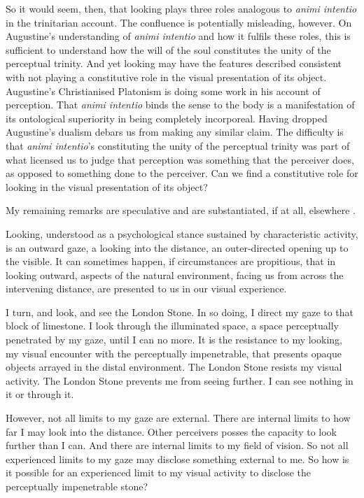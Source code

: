 \documentclass[12pt]{article}
\begin{document}
So it would seem, then, that looking plays three roles analogous to \emph{animi intentio} in the trinitarian account. The confluence is potentially misleading, however. On Augustine's understanding of \emph{animi intentio} and how it fulfils these roles, this is sufficient to understand how the will of the soul constitutes the unity of the perceptual trinity. And yet looking may have the features described consistent with not playing a constitutive role in the visual presentation of its object. Augustine's Christianised Platonism is doing some work in his account of perception. That \emph{animi intentio} binds the sense to the body is a manifestation of its ontological superiority in being completely incorporeal. Having dropped Augustine's dualism debars us from making any similar claim. The difficulty is that \emph{animi intentio}'s constituting the unity of the perceptual trinity was part of what licensed us to judge that perception was something that the perceiver does, as opposed to something done to the perceiver. Can we find a constitutive role for looking in the visual presentation of its object?

My remaining remarks are speculative and are substantiated, if at all, elsewhere \citep{Kalderon:2015aa}.

Looking, understood as a psychological stance sustained by characteristic activity, is an outward gaze, a looking into the distance, an outer-directed opening up to the visible. It can sometimes happen, if circumstances are propitious, that in looking outward, aspects of the natural environment, facing us from across the intervening distance, are presented to us in our visual experience. 

I turn, and look, and see the London Stone. In so doing, I direct my gaze to that block of limestone. I look through the illuminated space, a space perceptually penetrated by my gaze, until I can no more. It is the resistance to my looking, my visual encounter with the perceptually impenetrable, that presents opaque objects arrayed in the distal environment. The London Stone resists my visual activity. The London Stone prevents me from seeing further. I can see nothing in it or through it. 

However, not all limits to my gaze are external. There are internal limits to how far I may look into the distance. Other perceivers posses the capacity to look further than I can. And there are internal limits to my field of vision. So not all experienced limits to my gaze may disclose something external to me. So how is it possible for an experienced limit to my visual activity to disclose the perceptually impenetrable stone? 
\end{document}
